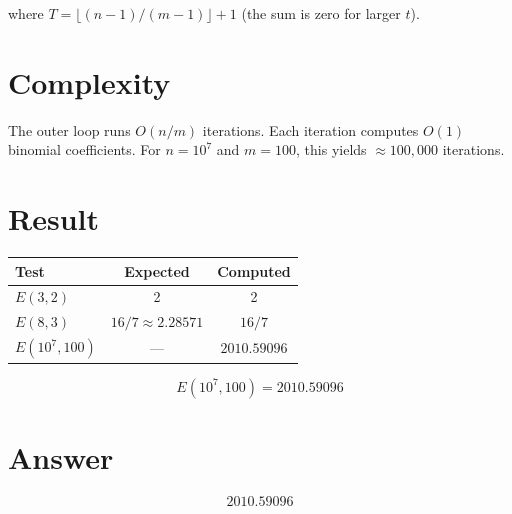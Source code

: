 \documentclass[11pt,a4paper]{article}
\begin{document}
where $T = \lfloor (n-1)/(m-1) \rfloor + 1$ (the sum is zero for larger $t$).

\section{Complexity}

The outer loop runs $O(n/m)$ iterations. Each iteration computes $O(1)$ binomial
coefficients. For $n = 10^7$ and $m = 100$, this yields $\approx 100{,}000$ iterations.

\section{Result}

\begin{center}
\begin{tabular}{lcc}
\toprule
\textbf{Test} & \textbf{Expected} & \textbf{Computed} \\
\midrule
$E(3, 2)$ & 2 & 2 \\
$E(8, 3)$ & $16/7 \approx 2.28571$ & $16/7$ \\
$E(10^7, 100)$ & --- & $2010.59096$ \\
\bottomrule
\end{tabular}
\end{center}

\[
    \boxed{E(10^7, 100) = 2010.59096}
\]

\section{Answer}

\[
\boxed{2010.59096}
\]
\end{document}
